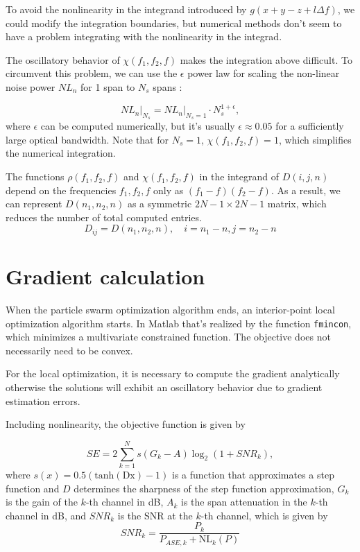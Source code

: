 \documentclass[a4paper]{article}
\begin{document}
To avoid the nonlinearity in the integrand introduced by $g(x+y-z+l\Delta f)$, we could modify the integration boundaries, but numerical methods don't seem to have a problem integrating with the nonlinearity in the integrad.

The oscillatory behavior of $\chi(f_1, f_2, f)$ makes the integration above difficult. To circumvent this problem, we can use the $\epsilon$ power law for scaling the non-linear noise power $NL_n$ for 1 span to $N_s$ spans \cite{Poggiolini2012}:

\begin{equation}
	NL_n\Big|_{N_s} = NL_n\Big|_{N_s = 1}\cdot N_s^{1+\epsilon},
\end{equation}
where $\epsilon$ can be computed numerically, but it's usually $\epsilon \approx 0.05$ for a sufficiently large optical bandwidth. Note that for $N_s = 1$, $\chi(f_1, f_2, f) = 1$, which simplifies the numerical integration.
 
The functions $\rho(f_1, f_2, f)$ and $\chi(f_1, f_2, f)$ in the integrand of $D(i, j, n)$ depend on the frequencies $f_1, f_2, f$ only as $(f_1-f)(f_2-f)$. As a result, we can represent $D(n_1, n_2, n)$ as a symmetric $2N-1\times 2N-1$ matrix, which reduces the number of total computed entries.
\begin{equation}
	D_{ij} = D(n_1, n_2, n), \quad i = n_1 - n, j = n_2 - n
\end{equation}

\section{Gradient calculation}

When the particle swarm optimization algorithm ends, an interior-point local optimization algorithm starts. In Matlab that's realized by the function \texttt{fmincon}, which minimizes a multivariate constrained function. The objective does not necessarily need to be convex.

For the local optimization, it is necessary to compute the gradient analytically otherwise the solutions will exhibit an oscillatory behavior due to gradient estimation errors.

Including nonlinearity, the objective function is given by

\begin{equation} \label{eq:grad:SE}
	SE = 2\sum_{k = 1}^N s(G_k - A)\log_2(1 +  SNR_k),
\end{equation}
where $s(x) = 0.5(\mathrm{tanh(Dx)}-1)$ is a function that approximates a step function and $D$ determines the sharpness of the step function approximation, $G_k$ is the gain of the $k$-th channel in dB, $A_k$ is the span attenuation in the $k$-th channel in dB, and $SNR_k$ is the SNR at the $k$-th channel, which is given by
\begin{equation}
	SNR_k = \frac{P_k}{P_{ASE, k} + \mathrm{NL}_k(P)}
\end{equation}
\end{document}
